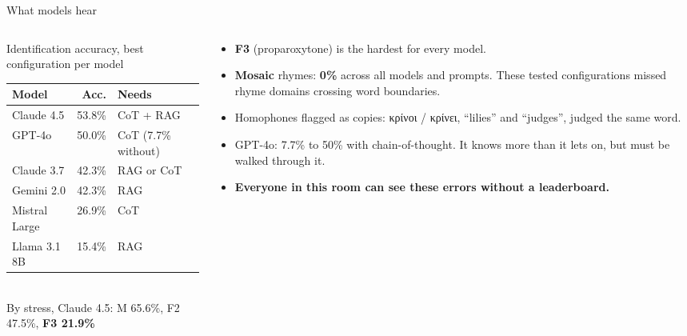 \documentclass[aspectratio=169, 10pt]{beamer}
\newcommand{\hl}[1]{\textcolor{terracotta}{\textbf{#1}}}
\begin{document}
\begin{frame}{What models hear}
  \small
  \begin{columns}[T]
    \begin{column}{0.5\textwidth}
      \centering
      \footnotesize
      Identification accuracy, best configuration per model\\[3pt]
      \begin{tabular}{lrl}
        \toprule
        \textbf{Model} & \textbf{Acc.} & \textbf{Needs} \\
        \midrule
        Claude 4.5 & 53.8\% & CoT + RAG \\
        GPT-4o & 50.0\% & CoT (7.7\% without) \\
        Claude 3.7 & 42.3\% & RAG or CoT \\
        Gemini 2.0 & 42.3\% & RAG \\
        Mistral Large & 26.9\% & CoT \\
        Llama 3.1 8B & 15.4\% & RAG \\
        \bottomrule
      \end{tabular}\\[6pt]
      By stress, Claude 4.5: M 65.6\%, F2 47.5\%, \hl{F3 21.9\%}
    \end{column}
    \begin{column}{0.48\textwidth}
      \begin{itemize}
        \item \textbf{F3} (proparoxytone) is the hardest for every model.
        \item \textbf{Mosaic} rhymes: \hl{0\%} across all models and prompts. These tested configurations missed rhyme domains crossing word boundaries.
        \item Homophones flagged as copies: κρίνοι / κρίνει, ``lilies'' and ``judges'', judged the same word.
        \item GPT-4o: 7.7\% to 50\% with chain-of-thought. It knows more than it lets on, but must be walked through it.
        \item \textbf{Everyone in this room can see these errors without a leaderboard.}
      \end{itemize}
    \end{column}
  \end{columns}
\end{frame}
\end{document}
